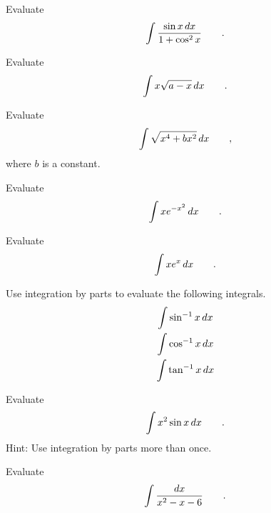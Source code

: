 \begin{hwsection}
\begin{hw}
Evaluate
\begin{equation*}
  \int \frac{\sin x \mathop{d\!} x}{1+\cos^2 x} \qquad .
\end{equation*}
\end{hw}

\begin{hw}
Evaluate
\begin{equation*}
  \int x\sqrt{a-x}\mathop{d\!} x \qquad .
\end{equation*}
\end{hw}

\begin{hw}
Evaluate
\begin{equation*}
  \int \sqrt{x^4+bx^2} \mathop{d\!} x \qquad ,
\end{equation*}
where $b$ is a constant.
\end{hw}

\begin{hw}
Evaluate
\begin{equation*}
  \int x e^{-x^2} \mathop{d\!} x \qquad .
\end{equation*}
\end{hw}

\begin{hw}
Evaluate
\begin{equation*}
  \int x e^x \mathop{d\!} x \qquad .
\end{equation*}
\end{hw}

\begin{hw}
Use integration by parts to evaluate the following integrals.
\begin{gather*}
  \int \sin^{-1} x\mathop{d\!} x \\
  \int \cos^{-1} x\mathop{d\!} x \\
  \int \tan^{-1} x\mathop{d\!} x 
\end{gather*}
\end{hw}

\begin{hw}
Evaluate
\begin{equation*}
  \int x^2 \sin x \mathop{d\!} x \qquad .
\end{equation*}
Hint: Use integration by parts more than once.
\end{hw}

\begin{hw}
Evaluate
\begin{equation*}
  \int \frac{\mathop{d\!} x}{x^2-x-6} \qquad .
\end{equation*}
\end{hw}


\end{hwsection}
